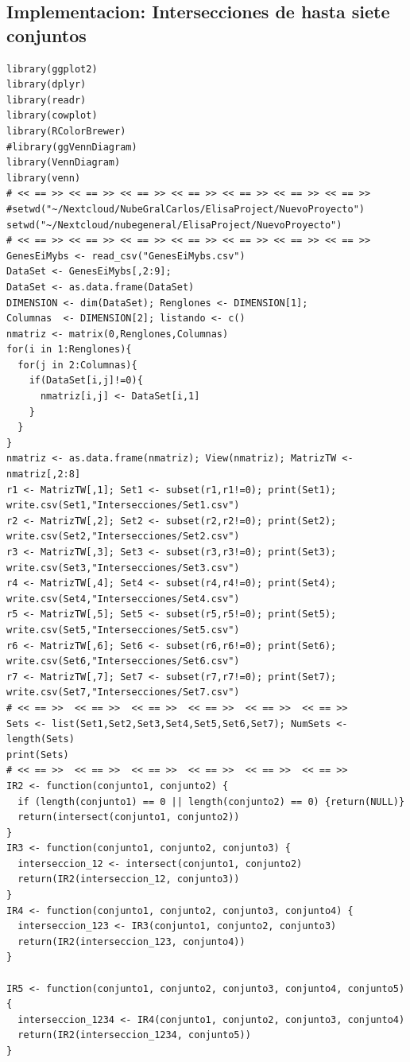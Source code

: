 \documentclass{article}
\begin{document}
\subsection{Implementacion: Intersecciones de hasta siete conjuntos}

\begin{verbatim}
library(ggplot2)
library(dplyr)
library(readr)
library(cowplot)
library(RColorBrewer)
#library(ggVennDiagram)
library(VennDiagram)
library(venn)
# << == >> << == >> << == >> << == >> << == >> << == >> << == >>
#setwd("~/Nextcloud/NubeGralCarlos/ElisaProject/NuevoProyecto")
setwd("~/Nextcloud/nubegeneral/ElisaProject/NuevoProyecto")
# << == >> << == >> << == >> << == >> << == >> << == >> << == >>
GenesEiMybs <- read_csv("GenesEiMybs.csv")
DataSet <- GenesEiMybs[,2:9];
DataSet <- as.data.frame(DataSet)
DIMENSION <- dim(DataSet); Renglones <- DIMENSION[1];
Columnas  <- DIMENSION[2]; listando <- c()
nmatriz <- matrix(0,Renglones,Columnas)
for(i in 1:Renglones){
  for(j in 2:Columnas){
    if(DataSet[i,j]!=0){
      nmatriz[i,j] <- DataSet[i,1]
    }
  }
}
nmatriz <- as.data.frame(nmatriz); View(nmatriz); MatrizTW <- nmatriz[,2:8]
r1 <- MatrizTW[,1]; Set1 <- subset(r1,r1!=0); print(Set1); write.csv(Set1,"Intersecciones/Set1.csv")
r2 <- MatrizTW[,2]; Set2 <- subset(r2,r2!=0); print(Set2); write.csv(Set2,"Intersecciones/Set2.csv")
r3 <- MatrizTW[,3]; Set3 <- subset(r3,r3!=0); print(Set3); write.csv(Set3,"Intersecciones/Set3.csv")
r4 <- MatrizTW[,4]; Set4 <- subset(r4,r4!=0); print(Set4); write.csv(Set4,"Intersecciones/Set4.csv")
r5 <- MatrizTW[,5]; Set5 <- subset(r5,r5!=0); print(Set5); write.csv(Set5,"Intersecciones/Set5.csv")
r6 <- MatrizTW[,6]; Set6 <- subset(r6,r6!=0); print(Set6); write.csv(Set6,"Intersecciones/Set6.csv")
r7 <- MatrizTW[,7]; Set7 <- subset(r7,r7!=0); print(Set7); write.csv(Set7,"Intersecciones/Set7.csv")
# << == >>  << == >>  << == >>  << == >>  << == >>  << == >> 
Sets <- list(Set1,Set2,Set3,Set4,Set5,Set6,Set7); NumSets <- length(Sets)
print(Sets)
# << == >>  << == >>  << == >>  << == >>  << == >>  << == >> 
IR2 <- function(conjunto1, conjunto2) {
  if (length(conjunto1) == 0 || length(conjunto2) == 0) {return(NULL)}
  return(intersect(conjunto1, conjunto2))
}
IR3 <- function(conjunto1, conjunto2, conjunto3) {
  interseccion_12 <- intersect(conjunto1, conjunto2)
  return(IR2(interseccion_12, conjunto3))
}
IR4 <- function(conjunto1, conjunto2, conjunto3, conjunto4) {
  interseccion_123 <- IR3(conjunto1, conjunto2, conjunto3)
  return(IR2(interseccion_123, conjunto4))
}

IR5 <- function(conjunto1, conjunto2, conjunto3, conjunto4, conjunto5) {
  interseccion_1234 <- IR4(conjunto1, conjunto2, conjunto3, conjunto4)
  return(IR2(interseccion_1234, conjunto5))
}


\end{verbatim}
\end{document}

